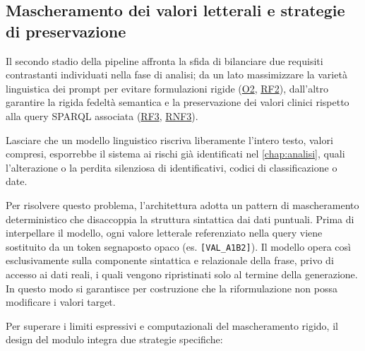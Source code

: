 \documentclass[12pt,a4paper,openright,twoside]{book}
\begin{document}
\subsection{Mascheramento dei valori letterali e strategie di preservazione}

Il secondo stadio della pipeline affronta la sfida di bilanciare due requisiti
contrastanti individuati nella fase di analisi; da un lato massimizzare la
varietà linguistica dei prompt per evitare formulazioni rigide
(\hyperref[obj:O2]{O2}, \hyperref[rf:RF2]{RF2}), dall'altro garantire la rigida
fedeltà semantica e la preservazione dei valori clinici rispetto alla query
SPARQL associata (\hyperref[rf:RF3]{RF3}, \hyperref[rnf:RNF3]{RNF3}).

Lasciare che un modello linguistico riscriva liberamente l'intero testo, valori
compresi, esporrebbe il sistema ai rischi già identificati nel
\cref{chap:analisi}, quali l'alterazione o la perdita silenziosa di
identificativi, codici di classificazione o date.

Per risolvere questo problema, l'architettura adotta un pattern di mascheramento
deterministico che disaccoppia la struttura sintattica dai dati puntuali. Prima
di interpellare il modello, ogni valore letterale referenziato nella query viene
sostituito da un token segnaposto opaco (es. \texttt{[VAL\_A1B2]}). Il modello
opera così esclusivamente sulla componente sintattica e relazionale della frase,
privo di accesso ai dati reali, i quali vengono ripristinati solo al termine
della generazione. In questo modo si garantisce per costruzione che la
riformulazione non possa modificare i valori target.

Per superare i limiti espressivi e computazionali del mascheramento rigido, il
design del modulo integra due strategie specifiche:
\end{document}
